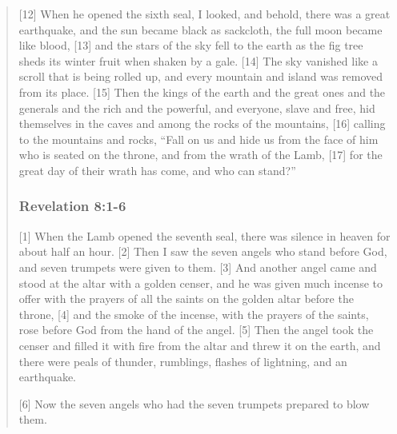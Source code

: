\begin{quote}
  [12] When he opened the sixth seal, I looked, and behold, there was a great
  earthquake, and the sun became black as sackcloth, the full moon became
  like blood, [13] and the stars of the sky fell to the earth as the fig tree
  sheds its winter fruit when shaken by a gale.  [14] The sky vanished like a
  scroll that is being rolled up, and every mountain and island was removed
  from its place.  [15] Then the kings of the earth and the great ones and
  the generals and the rich and the powerful, and everyone, slave and free,
  hid themselves in the caves and among the rocks of the mountains, [16]
  calling to the mountains and rocks, “Fall on us and hide us from the face
  of him who is seated on the throne, and from the wrath of the Lamb, [17]
  for the great day of their wrath has come, and who can stand?”

  \subsubsection*{Revelation 8:1-6}
  [1] When the Lamb opened the seventh seal, there was silence in heaven for
  about half an hour.  [2] Then I saw the seven angels who stand before God,
  and seven trumpets were given to them.  [3] And another angel came and
  stood at the altar with a golden censer, and he was given much incense to
  offer with the prayers of all the saints on the golden altar before the
  throne, [4] and the smoke of the incense, with the prayers of the saints,
  rose before God from the hand of the angel.  [5] Then the angel took the
  censer and filled it with fire from the altar and threw it on the earth,
  and there were peals of thunder, rumblings, flashes of lightning, and an
  earthquake.

  [6] Now the seven angels who had the seven trumpets prepared to blow them.
  \end{quote}

